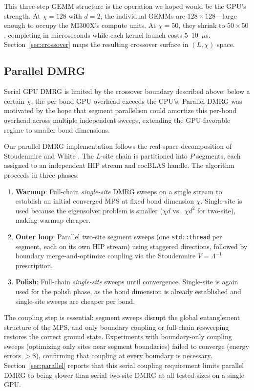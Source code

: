 \documentclass[preprint,12pt]{elsarticle}
\begin{document}
This three-step GEMM structure is the operation we hoped would be the GPU's strength.
At $\chi = 128$ with $d = 2$, the individual GEMMs are $128 \times 128$---large enough to occupy the MI300X's compute units.
At $\chi = 50$, they shrink to $50 \times 50$, completing in microseconds while each kernel launch costs 5--10~$\mu$s.
Section~\ref{sec:crossover} maps the resulting crossover surface in $(L, \chi)$ space.

\subsection{Parallel DMRG}
\label{sec:pdmrg}

Serial GPU DMRG is limited by the crossover boundary described above: below a certain $\chi$, the per-bond GPU overhead exceeds the CPU's.
Parallel DMRG was motivated by the hope that segment parallelism could amortize this per-bond overhead across multiple independent sweeps, extending the GPU-favorable regime to smaller bond dimensions.

Our parallel DMRG implementation follows the real-space decomposition of Stoudenmire and White \cite{Stoudenmire2013}.
The $L$-site chain is partitioned into $P$ segments, each assigned to an independent HIP stream and rocBLAS handle.
The algorithm proceeds in three phases:
\begin{enumerate}
  \item \textbf{Warmup}: Full-chain \emph{single-site} DMRG sweeps on a single stream to establish an initial converged MPS at fixed bond dimension $\chi$.
  Single-site is used because the eigensolver problem is smaller ($\chi d$ vs.\ $\chi d^2$ for two-site), making warmup cheaper.
  \item \textbf{Outer loop}: Parallel two-site segment sweeps (one \texttt{std::thread} per segment, each on its own HIP stream) using staggered directions, followed by boundary merge-and-optimize coupling via the Stoudenmire $V = \Lambda^{-1}$ prescription.
  \item \textbf{Polish}: Full-chain \emph{single-site} sweeps until convergence.
  Single-site is again used for the polish phase, as the bond dimension is already established and single-site sweeps are cheaper per bond.
\end{enumerate}

The coupling step is essential: segment sweeps disrupt the global entanglement structure of the MPS, and only boundary coupling or full-chain resweeping restores the correct ground state.
Experiments with boundary-only coupling sweeps (optimizing only sites near segment boundaries) failed to converge (energy errors $> 8$), confirming that coupling at every boundary is necessary.
Section~\ref{sec:parallel} reports that this serial coupling requirement limits parallel DMRG to being slower than serial two-site DMRG at all tested sizes on a single GPU.
\end{document}
